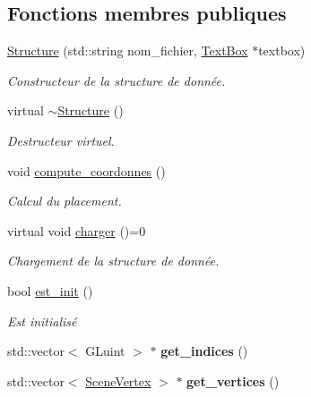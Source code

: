 \subsection*{Fonctions membres publiques}
\begin{DoxyCompactItemize}
\item 
\hyperlink{classStructure_a530fd6c5b4f999a7b06b3c4dad07337c}{Structure} (std\+::string nom\+\_\+fichier, \hyperlink{classTextBox}{Text\+Box} $\ast$textbox)
\begin{DoxyCompactList}\small\item\em Constructeur de la structure de donnée. \end{DoxyCompactList}\item 
\hypertarget{classStructure_a2d27a247175436df0976f24a83a47b5e}{virtual \hyperlink{classStructure_a2d27a247175436df0976f24a83a47b5e}{$\sim$\+Structure} ()}\label{classStructure_a2d27a247175436df0976f24a83a47b5e}

\begin{DoxyCompactList}\small\item\em Destructeur virtuel. \end{DoxyCompactList}\item 
void \hyperlink{classStructure_a9f9c7f0adff513ccef085b40cee7f6e6}{compute\+\_\+coordonnes} ()
\begin{DoxyCompactList}\small\item\em Calcul du placement. \end{DoxyCompactList}\item 
virtual void \hyperlink{classStructure_ae99db977c0b38122644cf458ea3d5974}{charger} ()=0
\begin{DoxyCompactList}\small\item\em Chargement de la structure de donnée. \end{DoxyCompactList}\item 
bool \hyperlink{classStructure_aa359fa1eec0c2983f10ec94bb14d600b}{est\+\_\+init} ()
\begin{DoxyCompactList}\small\item\em Est initialisé \end{DoxyCompactList}\item 
\hypertarget{classStructure_a4157095e5f5cbb1826c5884aac8bba8c}{std\+::vector$<$ G\+Luint $>$ $\ast$ {\bfseries get\+\_\+indices} ()}\label{classStructure_a4157095e5f5cbb1826c5884aac8bba8c}

\item 
\hypertarget{classStructure_ad5f67febcbc56fea6c21eb49d43fe028}{std\+::vector$<$ \hyperlink{structSceneVertex}{Scene\+Vertex} $>$ $\ast$ {\bfseries get\+\_\+vertices} ()}\label{classStructure_ad5f67febcbc56fea6c21eb49d43fe028}


\end{DoxyCompactItemize}
